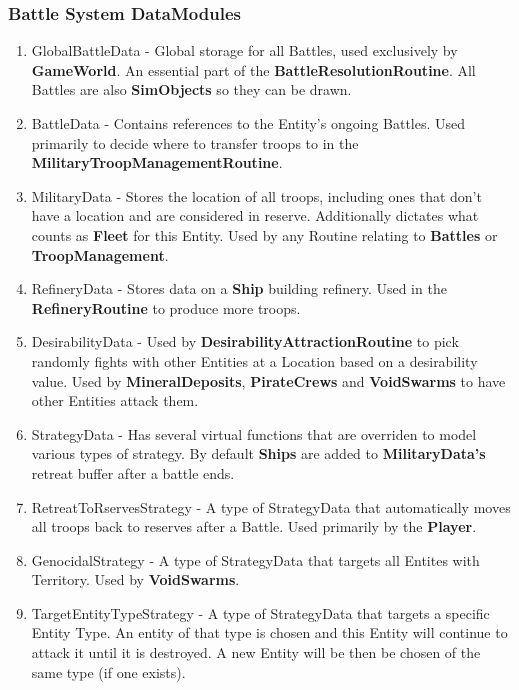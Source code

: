 \documentclass{report}
\begin{document}
\subsubsection{Battle System DataModules}

\begin{enumerate}

	\item GlobalBattleData - Global storage for all Battles, used exclusively by \textbf{GameWorld}. An essential part of the \textbf{BattleResolutionRoutine}. All Battles are also \textbf{SimObjects} so they can be drawn. 
 
	\item BattleData - Contains references to the Entity's ongoing Battles. Used primarily to decide where to transfer troops to in the \textbf{MilitaryTroopManagementRoutine}.

	\item MilitaryData - Stores the location of all troops, including ones that don't have a location and are considered in reserve. Additionally dictates what counts as \textbf{Fleet} for this Entity. Used by any Routine relating to \textbf{Battles} or \textbf{TroopManagement}.

	\item RefineryData - Stores data on a \textbf{Ship} building refinery. Used in the \textbf{RefineryRoutine} to produce more troops.

	\item DesirabilityData - Used by \textbf{DesirabilityAttractionRoutine} to pick randomly fights with other Entities at a Location based on a desirability value. Used by \textbf{MineralDeposits}, \textbf{PirateCrews} and \textbf{VoidSwarms} to have other Entities attack them.

	\item StrategyData - Has several virtual functions that are overriden to model various types of strategy. By default \textbf{Ships} are added to \textbf{MilitaryData's} retreat buffer after a battle ends.

	\item RetreatToRservesStrategy - A type of StrategyData that automatically moves all troops back to reserves after a Battle. Used primarily by the \textbf{Player}.

	\item GenocidalStrategy - A type of StrategyData that targets all Entites with Territory. Used by \textbf{VoidSwarms}.

	\item TargetEntityTypeStrategy - A type of StrategyData that targets a specific Entity Type. An entity of that type is chosen and this Entity will continue to attack it until it is destroyed. A new Entity will be then be chosen of the same type (if one exists).


\end{enumerate}
\end{document}
